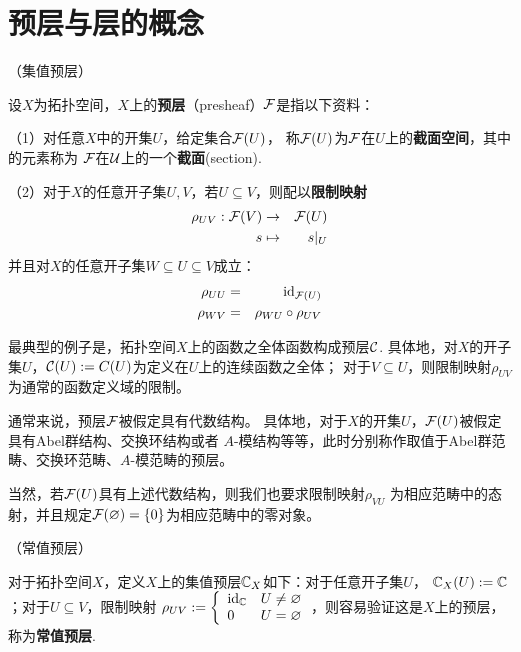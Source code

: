 \section{预层与层的概念}

\begin{definition}（集值预层）

设$X$为拓扑空间，$X$上的\textbf{预层}（presheaf）$\mathcal{F}$是指以下资料：

（1）对任意$X$中的开集$U$，给定集合$\mathcal{F}(U)$，
称$\mathcal{F}(U)$为$\mathcal{F}$在$U$上的\textbf{截面空间}，其中的元素称为
$\mathcal{F}$在$\mathcal{U}$上的一个\textbf{截面}(section).

（2）对于$X$的任意开子集$U,V$，若$U\subseteq V$，则配以\textbf{限制映射}
\begin{eqnarray*}
\rho_{UV}:\mathcal{F}(V)&\to&\mathcal{F}(U)\\
s&\mapsto&s|_U
\end{eqnarray*}
并且对$X$的任意开子集$W\subseteq U\subseteq V$成立：
\begin{eqnarray*}
\rho_{UU}&=&\operatorname{id}_{\mathcal{F}(U)} \\
\rho_{WV}&=&\rho_{WU}\circ\rho_{UV}
\end{eqnarray*}
\end{definition}

最典型的例子是，拓扑空间$X$上的函数之全体函数构成预层$\mathcal{C}$.
具体地，对$X$的开子集$U$，$\mathcal{C}(U):=C(U)$为定义在$U$上的连续函数之全体；
对于$V\subseteq U$，则限制映射$\rho_{UV}$为通常的函数定义域的限制。

\begin{rem}通常来说，预层$\mathcal{F}$被假定具有代数结构。
具体地，对于$X$的开集$U$，$\mathcal{F}(U)$被假定具有Abel群结构、交换环结构或者
$A$-模结构等等，此时分别称作取值于Abel群范畴、交换环范畴、$A$-模范畴的预层。
\end{rem}
当然，若$\mathcal{F}(U)$具有上述代数结构，则我们也要求限制映射$\rho_{VU}$
为相应范畴中的态射，并且规定$\mathcal{F}(\varnothing)=\{0\}$为相应范畴中的零对象。

\begin{example}（常值预层）
\label{常值预层-def}

对于拓扑空间$X$，定义$X$上的集值预层$\mathbb{C}_X$如下：对于任意开子集$U$，
$\mathbb{C}_X(U):=\mathbb{C}$；对于$U\subseteq V$，限制映射
$
  \rho_{UV}:=
  \left\{
    \begin{array}{ll}
      \operatorname{id}_{\mathbb{C}} & U\neq\varnothing\\
      0        & U=\varnothing
    \end{array}
  \right.
$，则容易验证这是$X$上的预层，称为\textbf{常值预层}.
\end{example}

